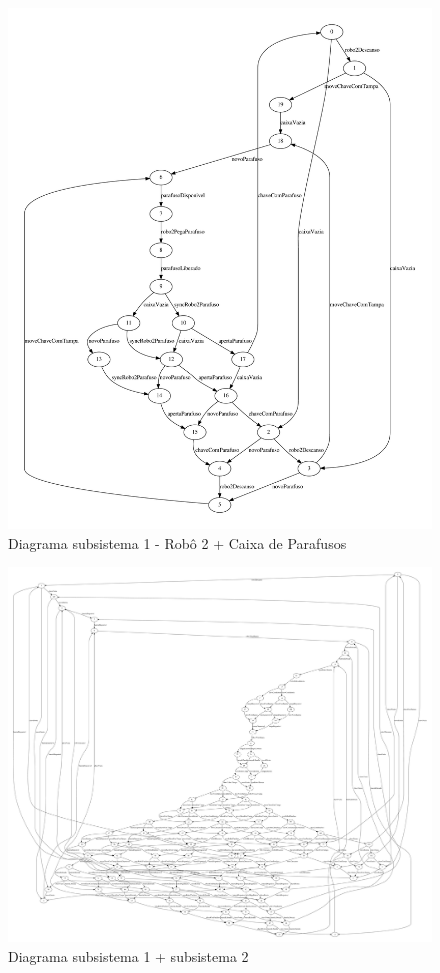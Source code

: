 \documentclass[a4paper,11pt,twocolumns]{article}
\begin{document}
\newpage
\begin{figure}[H]
    \centering
    \includegraphics[width = 0.9\linewidth]{./img/g_sistema4.pdf}
    \caption{Diagrama subsistema 1 - Robô 2 + Caixa de Parafusos}
    \label{fig:g_subsis4}
\end{figure}


\newpage
\begin{figure}[H]
    \centering
    \includegraphics[width = \linewidth]{./img/g_sistema12.pdf}
    \caption{Diagrama subsistema 1 + subsistema 2}
    \label{fig:g_subsis12}
\end{figure}
\end{document}
